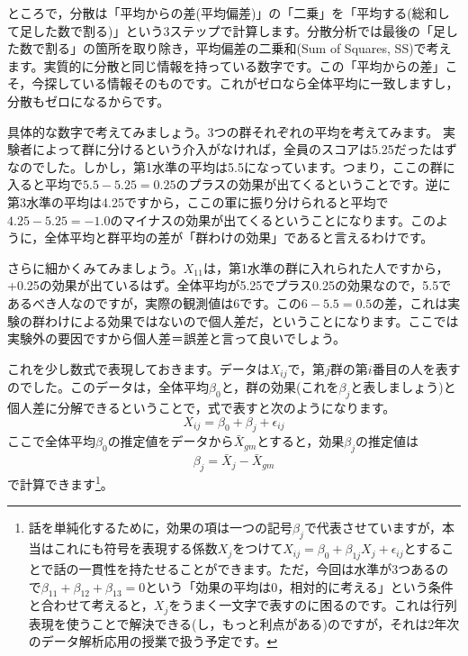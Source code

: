 \documentclass{ltjsarticle}
\begin{document}
ところで，分散は「平均からの差(平均偏差)」の「二乗」を「平均する(総和して足した数で割る)」という3ステップで計算します。分散分析では最後の「足した数で割る」の箇所を取り除き，平均偏差の二乗和(Sum of Squares, SS)で考えます。実質的に分散と同じ情報を持っている数字です。この「平均からの差」こそ，今探している情報そのものです。これがゼロなら全体平均に一致しますし，分散もゼロになるからです。

具体的な数字で考えてみましょう。3つの群それぞれの平均を考えてみます。
実験者によって群に分けるという介入がなければ，全員のスコアは5.25だったはずなのでした。しかし，第1水準の平均は5.5になっています。つまり，ここの群に入ると平均で$5.5-5.25=0.25$のプラスの効果が出てくるということです。逆に第3水準の平均は4.25ですから，ここの軍に振り分けられると平均で$4.25-5.25=-1.0$のマイナスの効果が出てくるということになります。このように，全体平均と群平均の差が「群わけの効果」であると言えるわけです。

さらに細かくみてみましょう。$X_{11}$は，第1水準の群に入れられた人ですから，+0.25の効果が出ているはず。全体平均が5.25でプラス0.25の効果なので，5.5であるべき人なのですが，実際の観測値は6です。この$6-5.5=0.5$の差，これは実験の群わけによる効果ではないので個人差だ，ということになります。ここでは実験外の要因ですから個人差＝誤差と言って良いでしょう。

これを少し数式で表現しておきます。データは$X_{ij}$で，第$j$群の第$i$番目の人を表すのでした。このデータは，全体平均$\beta_0$と，群の効果(これを$\beta_j$と表しましょう)と個人差に分解できるということで，式で表すと次のようになります。
$$ X_{ij} = \beta_0 + \beta_j + \epsilon_{ij} $$
ここで全体平均$\beta_0$の推定値をデータから$\bar{X}_{gm}$とすると，効果$\beta_j$の推定値は
$$ \beta_j  = \bar{X}_j - \bar{X}_{gm}$$
で計算できます\footnote{話を単純化するために，効果の項は一つの記号$\beta_j$で代表させていますが，本当はこれにも符号を表現する係数$X_j$をつけて$X_{ij}=\beta_0 + \beta_{1j} X_j + \epsilon_{ij}$とすることで話の一貫性を持たせることができます。ただ，今回は水準が3つあるので$\beta_{11}+\beta_{12}+\beta_{13}=0$という「効果の平均は$0$，相対的に考える」という条件と合わせて考えると，$X_j$をうまく一文字で表すのに困るのです。これは行列表現を使うことで解決できる(し，もっと利点がある)のですが，それは2年次のデータ解析応用の授業で扱う予定です。}。
\end{document}
